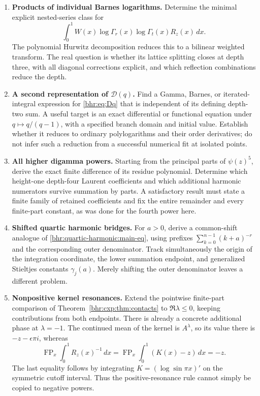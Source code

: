 \documentclass[11pt]{article}
\numberwithin{equation}{section}
\theoremstyle{plain}
\theoremstyle{definition}
\theoremstyle{remark}
\DeclareMathOperator{\FP}{FP}
\begin{document}
\begin{enumerate}[label=\textbf{F\arabic*.},leftmargin=*,itemsep=9pt]
 \item \textbf{Products of individual Barnes logarithms.}
 Determine the minimal explicit nested-series class for
 \[
  \int_0^1 W(x)\log\Gamma_r(x)\log\Gamma_t(x)R_z(x)\,dx.
 \]
 The polynomial Hurwitz decomposition reduces this to a bilinear
 weighted transform. The real question is whether its lattice
 splitting closes at depth three, with all diagonal corrections
 explicit, and which reflection combinations reduce the depth.

 \item \textbf{A second representation of $\mathcal D(q)$.}
 Find a Gamma, Barnes, or iterated-integral expression for
 \eqref{bhr:eq:Dq} that is independent of its defining depth-two sum.
 A useful target is an exact differential or functional equation
 under $q\mapsto q/(q-1)$, with a specified branch domain and
 initial value. Establish whether it reduces to ordinary
 polylogarithms and their order derivatives; do not infer such a
 reduction from a successful numerical fit at isolated points.

 \item \textbf{All higher digamma powers.}
 Starting from the principal parts of $\psi(z)^5$, derive the
 exact finite difference of its residue polynomial. Determine
 which height-one depth-four Laurent coefficients and which
 additional harmonic numerators survive summation by parts.
 A satisfactory result must state a finite family of retained
 coefficients and fix the entire remainder and every finite-part
 constant, as was done for the fourth power here.

 \item \textbf{Shifted quartic harmonic bridges.}
 For $a>0$, derive a common-shift analogue of
 \eqref{bhr:quartic-harmonic:main-eq}, using prefixes
 $\sum_{k=0}^{n-1}(k+a)^{-r}$ and the corresponding outer
 denominator. Track simultaneously the origin of the integration
 coordinate, the lower summation endpoint, and generalized
 Stieltjes constants $\gamma_j(a)$. Merely shifting the outer
 denominator leaves a different problem.

 \item \textbf{Nonpositive kernel resonances.}
 Extend the pointwise finite-part comparison of
 Theorem~\ref{bhr:cxp:thm:contacts} to $\Re\lambda\le0$,
 keeping contributions from both endpoints. There is already a
 concrete additional phase at $\lambda=-1$. The continued mean
 of the kernel is $A^\lambda$, so its value there is
 $-z-\epsilon\pi i$, whereas
 \[
  \FP_x\int_0^1 R_z(x)^{-1}\,dx
   =\FP_x\int_0^1(K(x)-z)\,dx=-z.
 \]
 The last equality follows by integrating $K=(\log\sin\pi x)'$
 on the symmetric cutoff interval. Thus the positive-resonance
 rule cannot simply be copied to negative powers.


\end{enumerate}
\end{document}
